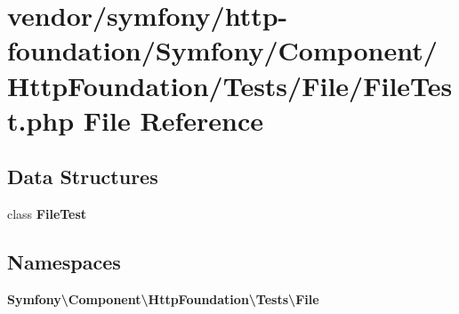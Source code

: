 \section{vendor/symfony/http-\/foundation/\+Symfony/\+Component/\+Http\+Foundation/\+Tests/\+File/\+File\+Test.php File Reference}
\label{_file_test_8php}
\subsection*{Data Structures}
\begin{DoxyCompactItemize}
\item 
class {\bf File\+Test}
\end{DoxyCompactItemize}
\subsection*{Namespaces}
\begin{DoxyCompactItemize}
\item 
 {\bf Symfony\textbackslash{}\+Component\textbackslash{}\+Http\+Foundation\textbackslash{}\+Tests\textbackslash{}\+File}
\end{DoxyCompactItemize}
